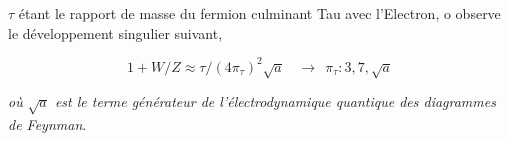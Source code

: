 \documentclass[a4paper,9pt]{article}
\newcounter{row}
\begin{document}
 $\tau$ étant le rapport de masse du fermion culminant Tau avec l'Electron, o observe le développement singulier suivant,  

\begin{equation}
 1+W/Z \approx \tau/(4\pi_{\tau})^2\sqrt a ~~~~ \rightarrow ~~ \pi_{\tau} : 3, 7, \sqrt a
\end{equation}

\textit {où $\sqrt a$ est le terme générateur de l'électrodynamique quantique des diagrammes de Feynman}.




\end{document}

